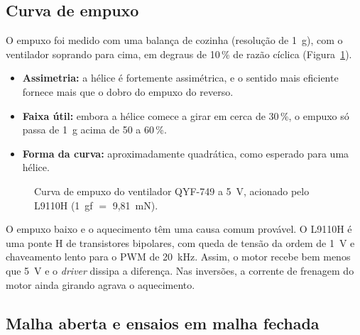\documentclass[a4paper,11pt]{article}
\begin{document}
\subsection{Curva de empuxo}

O empuxo foi medido com uma balança de cozinha (resolução de 1~g), com o ventilador soprando para
cima, em degraus de 10\,\% de razão cíclica (Figura~\ref{fig:empuxo}).
\begin{itemize}
  \item \textbf{Assimetria:} a hélice é fortemente assimétrica, e o sentido mais eficiente fornece
    mais que o dobro do empuxo do reverso.
  \item \textbf{Faixa útil:} embora a hélice comece a girar em cerca de 30\,\%, o empuxo só passa de
    1~g acima de 50 a 60\,\%.
  \item \textbf{Forma da curva:} aproximadamente quadrática, como esperado para uma hélice.
\end{itemize}

\begin{figure}[H]
\centering
{}
\caption{Curva de empuxo do ventilador QYF-749 a 5~V, acionado pelo L9110H (1~gf $=$ 9,81~mN).}
\label{fig:empuxo}
\end{figure}

O empuxo baixo e o aquecimento têm uma causa comum provável. O L9110H é uma ponte H de transistores
bipolares, com queda de tensão da ordem de 1~V e chaveamento lento para o PWM de 20~kHz. Assim, o
motor recebe bem menos que 5~V e o \textit{driver} dissipa a diferença. Nas inversões, a corrente
de frenagem do motor ainda girando agrava o aquecimento.

\subsection{Malha aberta e ensaios em malha fechada}
\end{document}
